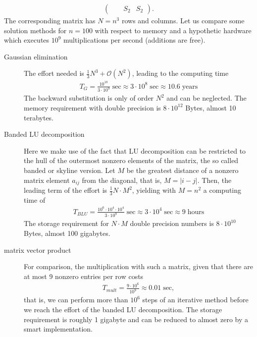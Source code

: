 \begin{intro}
\begin{gather*}
\begin{pmatrix}
      &&S_2 & S_2      
    \end{pmatrix}.
  \end{gather*}
  The corresponding matrix has $N=n^3$ rows and columns. Let us compare
  some solution methods for $n=100$ with respect to memory and a
  hypothetic hardware which executes $10^9$ multiplications per second
  (additions are free).
  \begin{description}
  \item[Gaussian elimination] The effort needed is $\tfrac13
    N^3+\mathcal O(N^2)$,
    leading to the computing time
    \begin{gather*}
      T_{G} = \frac{10^{18}}{3\cdot 10^9} \;\text{sec}
      \approx 3\cdot10^8 \;\text{sec}
      \approx 10.6 \;\text{years}
    \end{gather*}
    The backward substitution is only of order $N^2$ and can be
    neglected. The memory requirement with double precision is
    $8\cdot10^{12}$ Bytes, almost 10 terabytes.
  \item[Banded LU decomposition] Here we make use of the fact that LU
    decomposition can be restricted to the hull of the outermost
    nonzero elements of the matrix, the so called banded or skyline
    version. Let $M$ be the greatest distance of a nonzero matrix
    element $a_{ij}$ from the diagonal, that is, $M=\left|i-j\right|$. Then,
    the leading term of the effort is $\tfrac13 N\cdot M^2$, yielding
    with $M=n^2$ a computing time of
      \begin{gather*}
        T_{BLU} = \frac{10^{6}\cdot 10^{4} \cdot 10^{4}}{3\cdot 10^9} \;\text{sec}
      \approx 3\cdot10^4 \;\text{sec}
      \approx 9 \;\text{hours}
      \end{gather*}
      The storage requirement for $N\cdot M$ double precision numbers
      is $8\cdot 10^{10}$ Bytes, almost 100 gigabytes.
    \item[matrix vector product] For comparison, the multiplication
      with such a matrix, given that there are at most 9 nonzero
      entries per row costs
      \begin{gather*}
        T_{mult} = \frac{9\cdot 10^6}{10^9} \approx 0.01 \;\text{sec},
      \end{gather*}
      that is, we can perform more than $10^6$ steps of an iterative
      method before we reach the effort of the banded LU
      decomposition. The storage requirement is roughly 1 gigabyte and
      can be reduced to almost zero by a smart implementation. 
  \end{description}
\end{intro}

